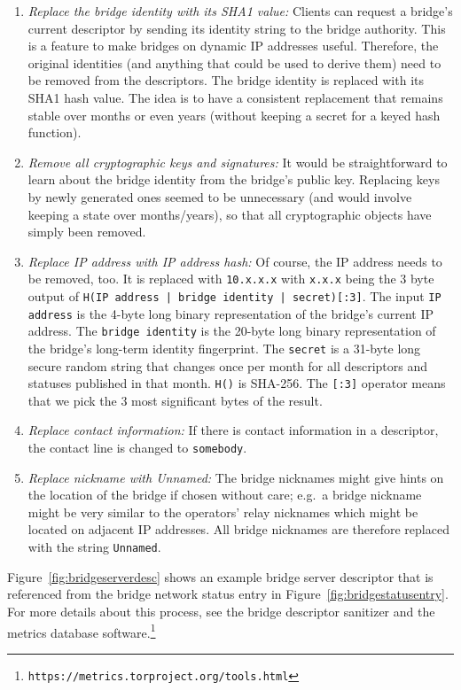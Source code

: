 \documentclass{article}
\begin{document}
\begin{enumerate}
\item \textit{Replace the bridge identity with its SHA1 value:} Clients
can request a bridge's current descriptor by sending its identity string
to the bridge authority.
This is a feature to make bridges on dynamic IP addresses useful.
Therefore, the original identities (and anything that could be used to
derive them) need to be removed from the descriptors.
The bridge identity is replaced with its SHA1 hash value.
The idea is to have a consistent replacement that remains stable over
months or even years (without keeping a secret for a keyed hash function).
\item \textit{Remove all cryptographic keys and signatures:} It would be
straightforward to learn about the bridge identity from the bridge's
public key.
Replacing keys by newly generated ones seemed to be unnecessary (and would
involve keeping a state over months/years), so that all cryptographic
objects have simply been removed. 
\item \textit{Replace IP address with IP address hash:} Of course, the IP
address needs to be removed, too.
It is replaced with \verb+10.x.x.x+ with \verb+x.x.x+ being the 3 byte
output of \verb+H(IP address | bridge identity | secret)[:3]+.
The input \verb+IP address+ is the 4-byte long binary representation of
the bridge's current IP address.
The \verb+bridge identity+ is the 20-byte long binary representation of
the bridge's long-term identity fingerprint.
The \verb+secret+ is a 31-byte long secure random string that changes once
per month for all descriptors and statuses published in that month.
\verb+H()+ is SHA-256.
The \verb+[:3]+ operator means that we pick the 3 most significant bytes
of the result.
\item \textit{Replace contact information:} If there is contact
information in a descriptor, the contact line is changed to
\verb+somebody+.
\item \textit{Replace nickname with Unnamed:} The bridge nicknames might
give hints on the location of the bridge if chosen without care; e.g.\ a
bridge nickname might be very similar to the operators' relay nicknames
which might be located on adjacent IP addresses.
All bridge nicknames are therefore replaced with the string
\verb+Unnamed+.
\end{enumerate}

Figure~\ref{fig:bridgeserverdesc} shows an example bridge server
descriptor that is referenced from the bridge network status entry in
Figure~\ref{fig:bridgestatusentry}.
For more details about this process, see the bridge descriptor sanitizer
and the metrics database
software.\footnote{\texttt{https://metrics.torproject.org/tools.html}}
\end{document}
